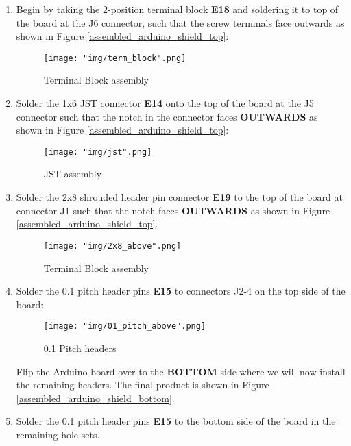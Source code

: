 \documentclass{article}
\begin{document}
\begin{enumerate}

	\item Begin by taking the 2-position terminal block \textbf{E18} and soldering it to top of the board at the J6 connector, such that the screw terminals face outwards as shown in Figure \ref{assembled_arduino_shield_top}:


\begin{figure}[H]
	\centering
	\texttt{[image: "img/term\_block".png]}
	\caption{Terminal Block assembly}
\end{figure}


	\item Solder the 1x6 JST connector \textbf{E14} onto the top of the board at the J5 connector such that the notch in the connector faces \textbf{OUTWARDS} as shown in Figure \ref{assembled_arduino_shield_top}:

\begin{figure}[H]
	\centering
	\texttt{[image: "img/jst".png]}
	\caption{JST assembly}
\end{figure}

	\item Solder the 2x8 shrouded header pin connector \textbf{E19} to the top of the board at connector J1 such that the notch faces \textbf{OUTWARDS} as shown in Figure \ref{assembled_arduino_shield_top}.

\begin{figure}[H]
	\centering
	\texttt{[image: "img/2x8\_above".png]}
	\caption{Terminal Block assembly}
\end{figure}

	\item Solder the 0.1 pitch header pins \textbf{E15} to connectors J2-4 on the top side of the board:

\begin{figure}[H]
	\centering
	\texttt{[image: "img/01\_pitch\_above".png]}
	\caption{0.1 Pitch headers}
\end{figure}

Flip the Arduino board over to the \textbf{BOTTOM} side where we will now install the remaining headers. The final product is shown in Figure \ref{assembled_arduino_shield_bottom}.

	\item Solder the 0.1 pitch header pins \textbf{E15} to the bottom side of the board in the remaining hole sets.


\end{enumerate}
\end{document}

